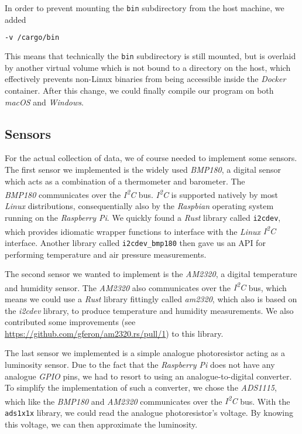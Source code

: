 In order to prevent mounting the \texttt{bin} subdirectory from the host machine, we added

\begin{lstlisting}[language=Bash]
-v /cargo/bin
\end{lstlisting}

This means that technically the \texttt{bin} subdirectory is still mounted, but is overlaid by
another virtual volume which is not bound to a directory on the host, which effectively prevents
non-Linux binaries from being accessible inside the \textit{Docker} container. After this change, we could
finally compile our program on both \textit{macOS} and \textit{Windows}.

\subsection{Sensors}

For the actual collection of data, we of course needed to implement some sensors. The first sensor
we implemented is the widely used \textit{BMP180}, a digital sensor which acts as a combination of a
thermometer and barometer. The \\ \textit{BMP180} communicates over the \textit{I\textsuperscript{2}C}
bus. \textit{I\textsuperscript{2}C} is supported natively by most \textit{Linux} distributions,
consequentially also by the \textit{Raspbian} operating system running on the \textit{Raspberry Pi}.
We quickly found a \textit{Rust} library called \texttt{i2cdev}, which provides idiomatic wrapper functions
to interface with the \textit{Linux} \textit{I\textsuperscript{2}C} interface. Another library
called \texttt{i2cdev\_bmp180} then gave us an API for performing temperature and air pressure
measurements.

The second sensor we wanted to implement is the \textit{AM2320}, a digital temperature and humidity
sensor. The \textit{AM2320} also communicates over the \textit{I\textsuperscript{2}C} bus, which
means we could use a \textit{Rust} library fittingly called \textit{am2320}, which also is based on the
\textit{i2cdev} library, to produce temperature and humidity measurements. We also contributed some
improvements (see \url{https://github.com/gferon/am2320.rs/pull/1}) to this library.

The last sensor we implemented is a simple analogue photoresistor acting as a luminosity sensor. Due
to the fact that the \textit{Raspberry Pi} does not have any analogue \textit{GPIO} pins, we had to
resort to using an analogue-to-digital converter. To simplify the implementation of such a
converter, we chose the \textit{ADS1115}, which like the \textit{BMP180} and \textit{AM2320}
communicates over the \textit{I\textsuperscript{2}C} bus. With the \texttt{ads1x1x} library, we
could read the analogue photoresistor's voltage. By knowing this voltage, we can then
approximate the luminosity.

